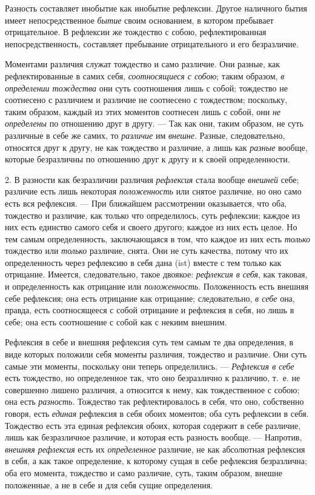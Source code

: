 Разность составляет инобытие как инобытие рефлексии. Другое наличного бытия
имеет непосредственное {\em бытие} своим основанием, в
котором пребывает отрицательное. В рефлексии же тождество с собою,
рефлектированная непосредственность, составляет пребывание отрицательного и
его безразличие.

Моментами различия служат тождество и само различие. Они разные, как
рефлектированные в самих себя, {\em соотносящиеся с
собою}; таким образом, {\em в определении тождества}
они суть соотношения лишь с собой; тождество не соотнесено с различием и
различие не соотнесено с тождеством; поскольку, таким образом, каждый из
этих моментов соотнесен лишь с собой, они {\em не
определены} по отношению друг в другу. — Так как они, таким образом, не
суть различные в себе же самих, то {\em различие} им
{\em внешне}. Разные, следовательно, относятся друг к
другу, не как тождество и различие, а лишь как
{\em разные} вообще, которые безразличны по отношению
друг к другу и к своей определенности.

2. В разности как безразличии различия {\em рефлексия}
стала вообще {\em внешней} себе; различие есть лишь
некоторая {\em положенность} или снятое различие, но
оно само есть вся рефлексия. — При ближайшем рассмотрении оказывается, что
оба, тождество и различие, как только что определилось, суть рефлексии;
каждое из них есть единство самого себя и своего другого; каждое из них
есть целое. Но тем самым определенность, заключающаяся в том, что каждое из
них есть {\em только} тождество или
{\em только} различие, снята. Они не суть качества,
потому что их определенность через рефлексию в себя дана (ist) вместе с тем
только как отрицание. Имеется, следовательно, такое двоякое:
{\em рефлексия в себя}, как таковая, и определенность
как отрицание или {\em положенность}. Положенность есть
внешняя себе рефлексия; она есть отрицание как отрицание; следовательно,
{\em в себе} она, правда, есть соотносящееся с собой
отрицание и рефлексия в себя, но лишь в себе; она есть соотношение с собой
как с некиим внешним.

Рефлексия в себе и внешняя рефлексия суть тем самым те два определения, в
виде которых положили себя моменты различия, тождество и различие. Они суть
самые эти моменты, поскольку они теперь определились. —
{\em Рефлексия в себе} есть тождество, но определенное
так, что оно безразлично к различию, т.~е. не совершенно лишено различия, а
относится к нему, как тождественное с собою; она есть
{\em разность}. Тождество так рефлектировалось в себя,
что оно, собственно говоря, есть {\em единая} рефлексия
в себя обоих моментов; оба суть рефлексии в себя. Тождество есть эта единая
рефлексия обоих, которая содержит в себе различие, лишь как безразличное
различие, и которая есть разность вообще. — Напротив,
{\em внешняя рефлексия} есть их
{\em определенное} различие, не как абсолютная
рефлексия в себя, а как такое определение, к которому сущая в себе
рефлексия безразлична; оба его момента, тождество и само различие, суть,
таким образом, внешне положенные, а не в себе и для себя сущие определения.

